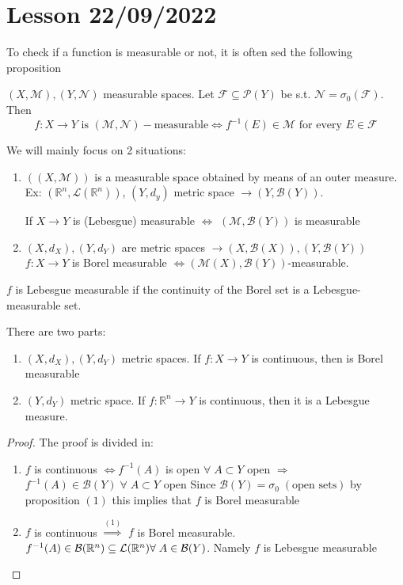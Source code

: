 \section{Lesson 22/09/2022}
To check if a function is measurable or not, it is often sed the following proposition
\begin{proposition}
    \((X, \mathcal{M}), (Y, \mathcal{N})\) measurable spaces. Let \(\mathcal{F} \subseteq \mathcal{P}(Y)\) be s.t. \(\mathcal{N} = \sigma_0(\mathcal{F})\). Then
    \[
        f: X \to Y \mbox{ is } (\mathcal{M}, \mathcal{N})-\mbox{measurable} \Leftrightarrow f^{-1}(E) \in \mathcal{M} \mbox{ for every } E \in \mathcal{F}
    \]
\end{proposition}

We will mainly focus on 2 situations:
\begin{enumerate}
    \item  \(((X, \mathcal{M}))\) is a measurable space obtained by means of an outer measure. \\
    Ex: \((\mathbb{R}^n, \mathcal{L}(\mathbb{R}^n))\), \((Y, d_y)\) metric space \(\to (Y, \mathcal{B}(Y))\). 

    If \(X \to Y\) is (Lebesgue) measurable \(\Leftrightarrow\) \((\mathcal{M}, \mathcal{B}(Y))\) is measurable

    \item \((X, d_X), (Y, d_Y)\) are metric spaces \(\longrightarrow (X, \mathcal{B}(X)), (Y, \mathcal{B}(Y))\) \\
    \(f: X \to Y\) is Borel measurable \(\Leftrightarrow (\mathcal{M}(X), \mathcal{B}(Y)) \)-measurable.
\end{enumerate}
\begin{remark}
     \(f\) is Lebesgue measurable if the continuity of the Borel set is a Lebesgue-measurable set.
\end{remark}
\begin{proposition}
    There are two parts:
    \begin{enumerate}
        \item \((X, d_X), (Y, d_Y)\) metric spaces. If \(f:X \to Y\) is continuous, then is Borel measurable
        \item \((Y, d_Y)\) metric space. If \(f:\mathbb{R}^n \to Y\) is continuous, then it is a Lebesgue measure.
    \end{enumerate}
\end{proposition}
\begin{proof}
    The proof is divided in:
    \begin{enumerate}
        \item \(f\) is continuous \(\Leftrightarrow f^{-1}(A)\) is open \(\forall \; A \subset Y\)
        open \(\Rightarrow\) \(f^{-1}(A) \in \mathcal{B}(Y) \; \forall \; A \subset Y\) open
        Since \(\mathcal{B}(Y) = \sigma_0 \; (\mbox{open sets})\) by proposition \((1)\) this implies that \(f\) is Borel measurable
        \item \(f\) is continuous \(\overset{(1)}{\Rightarrow}\) \(f\) is Borel measurable.
        \(f^{-1}(A) \in \mathcal{B}(\mathbb{R}^n) \subseteq \mathcal{L}(\mathbb{R}^n) \forall \; A \in \mathcal{B}(Y)\). Namely \(f\) is Lebesgue measurable
    \end{enumerate}
\end{proof}
